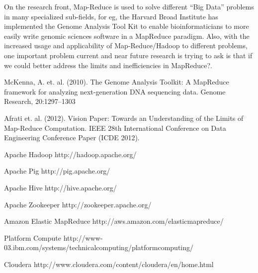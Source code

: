 \documentclass[]{article}
\begin{document}
On the research front, Map-Reduce is used to solve different “Big Data” problems in many specialized sub-fields, for eg, the Harvard Broad Institute has implemented the Genome Analysis Tool Kit to enable bioinformaticians to more easily write genomic sciences software in a MapReduce paradigm\cite{mckenna}. Also, with the increased usage and applicability of Map-Reduce/Hadoop to different problems, one important problem current and near future research is trying to ask is that if we could better address the limits and inefficiencies in MapReduce?\cite{afrati}.\\

\clearpage
\begin{thebibliography}{99}
McKenna, A. et. al. (2010). The Genome Analysis Toolkit: A MapReduce framework for analyzing next-generation DNA sequencing data. Genome Research, 20:1297–1303

Afrati et. al. (2012). Vision Paper: Towards an Understanding of the Limits of Map-Reduce Computation. IEEE 28th International Conference on Data Engineering Conference Paper (ICDE 2012).

Apache Hadoop
http://hadoop.apache.org/ 

Apache Pig
http://pig.apache.org/

Apache Hive 
http://hive.apache.org/

Apache Zookeeper
http://zookeeper.apache.org/

Amazon Elastic MapReduce
http://aws.amazon.com/elasticmapreduce/

Platform Compute
http://www-03.ibm.com/systems/technicalcomputing/platformcomputing/

Cloudera
http://www.cloudera.com/content/cloudera/en/home.html

\end{thebibliography}
\end{document}
